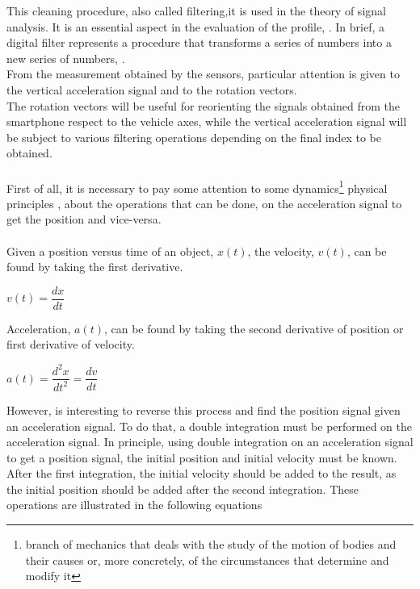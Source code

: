 \documentclass{standalone}
\begin{document}
\noindent This cleaning procedure, also called filtering,it is used in the theory of signal analysis.
It is an essential aspect in the evaluation of the profile, \cite{little_book}. In brief, a digital filter represents a procedure that transforms a series of numbers into a new series of numbers, \cite{little_book}.\\
From the measurement obtained by the sensors, particular attention is given to the vertical acceleration signal and to the rotation vectors. \\
The rotation vectors will be useful for reorienting the signals obtained from the smartphone\cite{Andro} respect to the vehicle axes, while the vertical acceleration signal will be subject to various filtering operations depending on the final index to be obtained.\\\\
First of all, it is necessary to pay some attention to some dynamics\footnote{branch of mechanics that deals with the study of the motion of bodies and their causes or, more concretely, of the circumstances that determine and modify it} physical principles , about the operations that can be done, on the acceleration signal to get the position and vice-versa.\\\\
Given a position versus time of an object, $x(t)$, the velocity, $v(t)$, can be found by taking the first derivative.\\
\begin{center}
{\large $v(t) = \dfrac{dx}{dt}$}
\end{center}
Acceleration, $a(t)$, can be found by taking the second derivative of position or first
derivative of velocity.
\begin{center}
{\large $a(t) = \dfrac{d^{2}x}{dt^{2}} = \dfrac{dv}{dt}$}
\end{center}
However, is interesting to reverse this process and find the position signal given an acceleration signal. To do that, a double integration must be performed on the acceleration signal.
In principle, using double integration on an acceleration signal to get a position signal, the initial position and initial velocity must be known. After the first integration, the initial velocity should be added to the result, as the initial position should be added after the second integration. These operations are illustrated in the following equations
\end{document}
